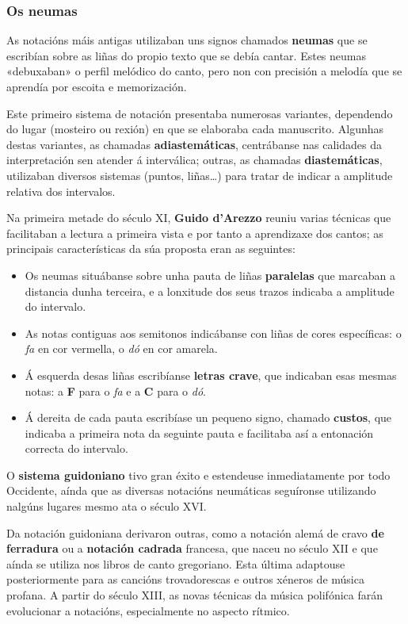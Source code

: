 \documentclass[a4paper, twoside]{templates/ociamthesis}
\providecommand{\tightlist}{%
  \setlength{\itemsep}{0pt}\setlength{\parskip}{0pt}}
\begin{document}
\hypertarget{os-neumas}{%
\subsubsection{Os neumas}\label{os-neumas}}

As notacións máis antigas utilizaban uns signos chamados \textbf{neumas} que se escribían sobre as liñas do propio texto que se debía cantar. Estes neumas «debuxaban» o perfil melódico do canto, pero non con precisión a melodía que se aprendía por escoita e memorización.

Este primeiro sistema de notación presentaba numerosas variantes, dependendo do lugar (mosteiro ou rexión) en que se elaboraba cada manuscrito. Algunhas destas variantes, as chamadas \textbf{adiastemáticas}, centrábanse nas calidades da interpretación sen atender á interválica; outras, as chamadas \textbf{diastemáticas}, utilizaban diversos sistemas (puntos, liñas\ldots) para tratar de indicar a amplitude relativa dos intervalos.

Na primeira metade do século XI, \textbf{Guido d'Arezzo} reuniu varias técnicas que facilitaban a lectura a primeira vista e por tanto a aprendizaxe dos cantos; as principais características da súa proposta eran as seguintes:

\begin{itemize}
\tightlist
\item
  Os neumas situábanse sobre unha pauta de liñas \textbf{paralelas} que marcaban a distancia dunha terceira, e a lonxitude dos seus trazos indicaba a amplitude do intervalo.
\item
  As notas contiguas aos semitonos indicábanse con liñas de cores específicas: o \emph{fa} en cor vermella, o \emph{dó} en cor amarela.
\item
  Á esquerda desas liñas escribíanse \textbf{letras crave}, que indicaban esas mesmas notas: a \textbf{F} para o \emph{fa} e a \textbf{C} para o \emph{dó}.
\item
  Á dereita de cada pauta escribíase un pequeno signo, chamado \textbf{custos}, que indicaba a primeira nota da seguinte pauta e facilitaba así a entonación correcta do intervalo.
\end{itemize}

O \textbf{sistema guidoniano} tivo gran éxito e estendeuse inmediatamente por todo Occidente, aínda que as diversas notacións neumáticas seguíronse utilizando nalgúns lugares mesmo ata o século XVI.

Da notación guidoniana derivaron outras, como a notación alemá de cravo \textbf{de ferradura} ou a \textbf{notación cadrada} francesa, que naceu no século XII e que aínda se utiliza nos libros de canto gregoriano. Esta última adaptouse posteriormente para as cancións trovadorescas e outros xéneros de música profana. A partir do século XIII, as novas técnicas da música polifónica farán evolucionar a notacións, especialmente no aspecto rítmico.
\end{document}
